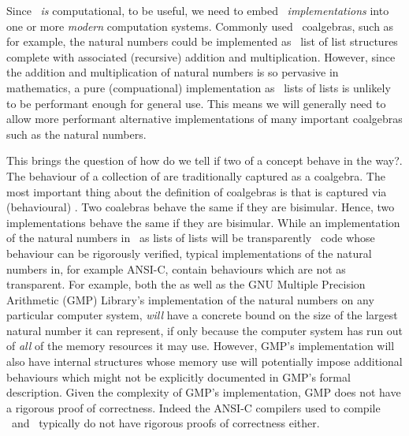 Since \joylol\ \emph{is} computational, to be useful, we need to embed 
\joylol\ \emph{implementations} into one or more \emph{modern} computation 
systems. Commonly used \joylol\ coalgebras, such as for example, the 
natural numbers could be implemented as \joylolZero\ list of list 
structures complete with associated (recursive) addition and 
multiplication. However, since the addition and multiplication of natural 
numbers is so pervasive in mathematics, a pure (compuational) 
implementation as \joylolZero\ lists of lists is unlikely to be performant 
enough for general use. This means we will generally need to allow more 
performant alternative implementations of many important coalgebras such 
as the natural numbers. 

This brings the question of how do we tell if two  
of a concept behave in the  way?. The behaviour of a 
collection of  are traditionally captured as a coalgebra. 
The most important thing about the definition of coalgebras is that 
 is captured via (behavioural) . Two 
coalebras behave the same if they are bisimular. Hence, two 
implementations behave the same if they are bisimular. While an 
implementation of the natural numbers in \joylolZero\ as lists of lists 
will be transparently \joylolZero\ code whose behaviour can be rigorously 
verified, typical implementations of the natural numbers in, for example 
ANSI-C, contain behaviours which are not as transparent. For example, both 
the \joylolZero as well as the GNU Multiple Precision Arithmetic (GMP) 
Library's implementation of the natural numbers on any particular computer 
system, \emph{will} have a concrete bound on the size of the largest 
natural number it can represent, if only because the computer system has 
run out of \emph{all} of the memory resources it may use. However, GMP's 
implementation will also have internal structures whose memory use will 
potentially impose additional behaviours which might not be explicitly 
documented in GMP's formal description. Given the complexity of GMP's 
implementation, GMP does not have a rigorous proof of correctness. Indeed 
the ANSI-C compilers used to compile \joylolZero\ and \joylol\ typically 
do not have rigorous proofs of correctness either. 


